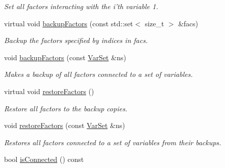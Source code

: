\begin{CompactItemize}
\begin{CompactList}\small\item\em Set all factors interacting with the i'th variable 1. \item\end{CompactList}\item 
\hypertarget{classdai_1_1FactorGraph_6965352b4e04b47fd7ad551d9c1916f2}{
virtual void \hyperlink{classdai_1_1FactorGraph_6965352b4e04b47fd7ad551d9c1916f2}{backupFactors} (const std::set$<$ size\_\-t $>$ \&facs)}
\label{classdai_1_1FactorGraph_6965352b4e04b47fd7ad551d9c1916f2}

\begin{CompactList}\small\item\em Backup the factors specified by indices in facs. \item\end{CompactList}\item 
\hypertarget{classdai_1_1FactorGraph_8b3606b4ee589e4a0fb8fcdbdff97bae}{
void \hyperlink{classdai_1_1FactorGraph_8b3606b4ee589e4a0fb8fcdbdff97bae}{backupFactors} (const \hyperlink{classdai_1_1VarSet}{VarSet} \&ns)}
\label{classdai_1_1FactorGraph_8b3606b4ee589e4a0fb8fcdbdff97bae}

\begin{CompactList}\small\item\em Makes a backup of all factors connected to a set of variables. \item\end{CompactList}\item 
\hypertarget{classdai_1_1FactorGraph_0fe64720797972b14f1b41486d339f81}{
virtual void \hyperlink{classdai_1_1FactorGraph_0fe64720797972b14f1b41486d339f81}{restoreFactors} ()}
\label{classdai_1_1FactorGraph_0fe64720797972b14f1b41486d339f81}

\begin{CompactList}\small\item\em Restore all factors to the backup copies. \item\end{CompactList}\item 
\hypertarget{classdai_1_1FactorGraph_4e042494d8e453005d0c8bfd788dc687}{
void \hyperlink{classdai_1_1FactorGraph_4e042494d8e453005d0c8bfd788dc687}{restoreFactors} (const \hyperlink{classdai_1_1VarSet}{VarSet} \&ns)}
\label{classdai_1_1FactorGraph_4e042494d8e453005d0c8bfd788dc687}

\begin{CompactList}\small\item\em Restores all factors connected to a set of variables from their backups. \item\end{CompactList}\item 
\hypertarget{classdai_1_1FactorGraph_d1e3c45492a64959fec4736adf555528}{
bool \hyperlink{classdai_1_1FactorGraph_d1e3c45492a64959fec4736adf555528}{isConnected} () const }
\label{classdai_1_1FactorGraph_d1e3c45492a64959fec4736adf555528}


\end{CompactItemize}
